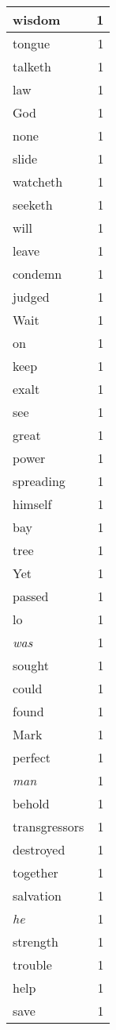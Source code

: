 \begin{center}
\begin{longtable}{l|r}
wisdom & 1 \\ \hline
tongue & 1 \\ \hline
talketh & 1 \\ \hline
law & 1 \\ \hline
God & 1 \\ \hline
none & 1 \\ \hline
slide & 1 \\ \hline
watcheth & 1 \\ \hline
seeketh & 1 \\ \hline
will & 1 \\ \hline
leave & 1 \\ \hline
condemn & 1 \\ \hline
judged & 1 \\ \hline
Wait & 1 \\ \hline
on & 1 \\ \hline
keep & 1 \\ \hline
exalt & 1 \\ \hline
see & 1 \\ \hline
great & 1 \\ \hline
power & 1 \\ \hline
spreading & 1 \\ \hline
himself & 1 \\ \hline
bay & 1 \\ \hline
tree & 1 \\ \hline
Yet & 1 \\ \hline
passed & 1 \\ \hline
lo & 1 \\ \hline
\emph{was} & 1 \\ \hline
sought & 1 \\ \hline
could & 1 \\ \hline
found & 1 \\ \hline
Mark & 1 \\ \hline
perfect & 1 \\ \hline
\emph{man} & 1 \\ \hline
behold & 1 \\ \hline
transgressors & 1 \\ \hline
destroyed & 1 \\ \hline
together & 1 \\ \hline
salvation & 1 \\ \hline
\emph{he} & 1 \\ \hline
strength & 1 \\ \hline
trouble & 1 \\ \hline
help & 1 \\ \hline
save & 1 \\ \hline
\end{longtable}
\end{center}



